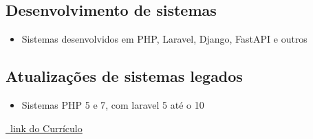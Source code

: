 \documentclass{article}
\begin{document}
\subsection{Desenvolvimento de sistemas}
\begin{itemize}
  \item Sistemas desenvolvidos em PHP, Laravel, Django, FastAPI e outros 
\end{itemize}

\subsection{Atualizações de sistemas legados}
\begin{itemize}
  \item Sistemas PHP 5 e 7, com laravel 5 até o 10
\end{itemize}




\href{https://github.com/PedroPaulo-98/Curriculo}{\faGithub\ link do Currículo}
\end{document}
